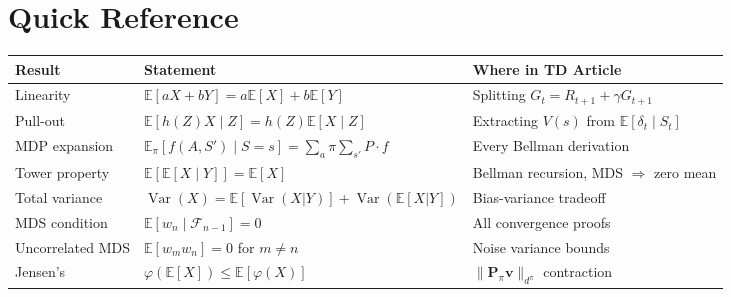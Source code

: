 \documentclass[11pt,a4paper]{article}
\theoremstyle{definition}
\theoremstyle{plain}
\theoremstyle{remark}
\DeclareMathOperator{\Var}{Var}
\newcommand{\E}{\mathbb{E}}
\begin{document}
\section{Quick Reference}
\label{sec:reference}

\begin{center}
\renewcommand{\arraystretch}{1.5}
\begin{tabular}{p{3.2cm} p{5.5cm} p{5.5cm}}
\toprule
\textbf{Result} & \textbf{Statement} & \textbf{Where in TD Article} \\
\midrule
Linearity & $\E[aX + bY] = a\E[X] + b\E[Y]$ & Splitting $G_t = R_{t+1} + \gamma G_{t+1}$ \\
Pull-out & $\E[h(Z)X \mid Z] = h(Z)\E[X \mid Z]$ & Extracting $V(s)$ from $\E[\delta_t \mid S_t]$ \\
MDP expansion & $\E_\pi[f(A,S') \mid S\!=\!s] = \sum_a \pi \sum_{s'} P \cdot f$ & Every Bellman derivation \\
Tower property & $\E[\E[X \mid Y]] = \E[X]$ & Bellman recursion, MDS $\Rightarrow$ zero mean \\
Total variance & $\Var(X) = \E[\Var(X|Y)] + \Var(\E[X|Y])$ & Bias-variance tradeoff \\
MDS condition & $\E[w_n \mid \mathcal{F}_{n-1}] = 0$ & All convergence proofs \\
Uncorrelated MDS & $\E[w_m w_n] = 0$ for $m \neq n$ & Noise variance bounds \\
Jensen's & $\varphi(\E[X]) \leq \E[\varphi(X)]$ & $\|\mathbf{P}_\pi \mathbf{v}\|_{d^\pi}$ contraction \\
\bottomrule
\end{tabular}
\end{center}
\end{document}
